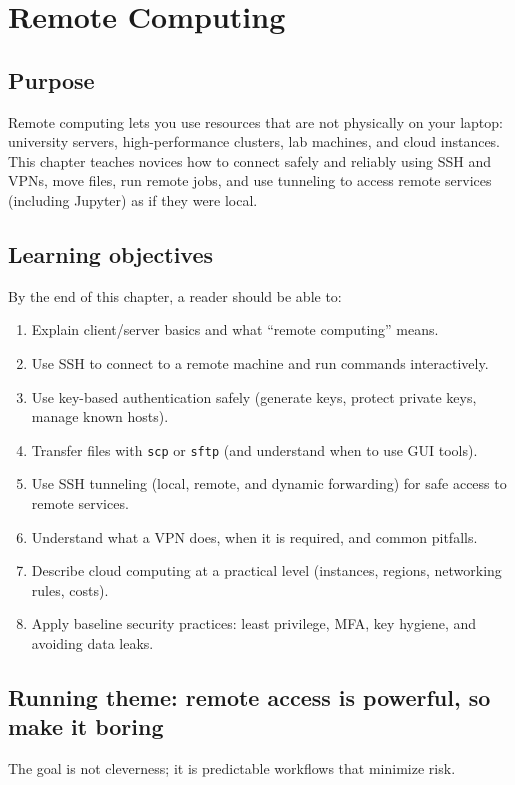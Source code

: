\chapter{Remote Computing}
\label{ch:remote-computing}

\section*{Purpose}
Remote computing lets you use resources that are not physically on your laptop: university servers, high-performance clusters, lab machines, and cloud instances. This chapter teaches novices how to connect safely and reliably using SSH and VPNs, move files, run remote jobs, and use tunneling to access remote services (including Jupyter) as if they were local.

\section*{Learning objectives}
By the end of this chapter, a reader should be able to:
\begin{enumerate}
\item Explain client/server basics and what ``remote computing'' means.
\item Use SSH to connect to a remote machine and run commands interactively.
\item Use key-based authentication safely (generate keys, protect private keys, manage known hosts).
\item Transfer files with \texttt{scp} or \texttt{sftp} (and understand when to use GUI tools).
\item Use SSH tunneling (local, remote, and dynamic forwarding) for safe access to remote services.
\item Understand what a VPN does, when it is required, and common pitfalls.
\item Describe cloud computing at a practical level (instances, regions, networking rules, costs).
\item Apply baseline security practices: least privilege, MFA, key hygiene, and avoiding data leaks.
\end{enumerate}

\section*{Running theme: remote access is powerful, so make it boring}
The goal is not cleverness; it is predictable workflows that minimize risk.

